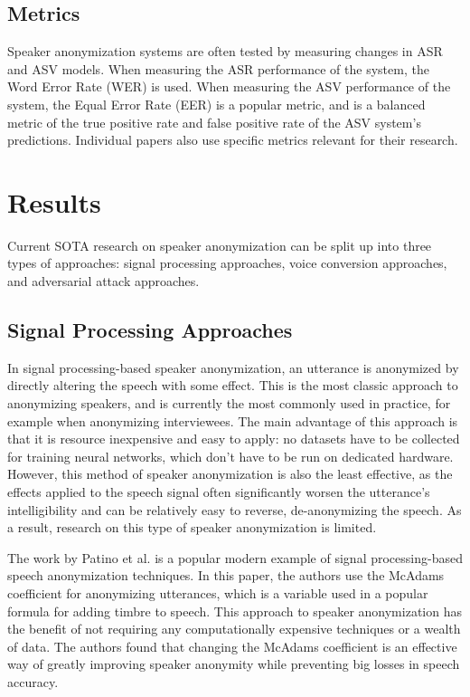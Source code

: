 \documentclass{Interspeech2024}
\begin{document}
\subsection{Metrics}
Speaker anonymization systems are often tested by measuring changes in ASR and ASV models.
When measuring the ASR performance of the system, the Word Error Rate (WER) is used.
When measuring the ASV performance of the system, the Equal Error Rate (EER) is a popular metric, and is a balanced metric of the true positive rate and false positive rate of the ASV system's predictions.
Individual papers also use specific metrics relevant for their research.


\section{Results}
Current SOTA research on speaker anonymization can be split up into three types of approaches: signal processing approaches, voice conversion approaches, and adversarial attack approaches.

\subsection{Signal Processing Approaches}
In signal processing-based speaker anonymization, an utterance is anonymized by directly altering the speech with some effect.
This is the most classic approach to anonymizing speakers, and is currently the most commonly used in practice, for example when anonymizing interviewees.
The main advantage of this approach is that it is resource inexpensive and easy to apply: no datasets have to be collected for training neural networks, which don't have to be run on dedicated hardware.
However, this method of speaker anonymization is also the least effective, as the effects applied to the speech signal often significantly worsen the utterance's intelligibility and can be relatively easy to reverse, de-anonymizing the speech.
As a result, research on this type of speaker anonymization is limited.

The work by Patino et al. \cite{patino_2021_mcadams} is a popular modern example of signal processing-based speech anonymization techniques.
In this paper, the authors use the McAdams coefficient for anonymizing utterances, which is a variable used in a popular formula for adding timbre to speech. 
This approach to speaker anonymization has the benefit of not requiring any computationally expensive techniques or a wealth of data. 
The authors found that changing the McAdams coefficient is an effective way of greatly improving speaker anonymity while preventing big losses in speech accuracy.
\end{document}
